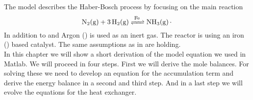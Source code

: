 \documentclass[paper=letter, fontsize=12pt]{article}
\newcommand\reaction[1]{\begin{equation}\ce{#1}\end{equation}}
\begin{document}
The model describes the Haber-Bosch process by focusing on the main reaction
\reaction{N2(g) + 3H2(g) <=>[Fe] NH3(g).} \label{f:reaction}
In addition to  and  Argon () is used as an inert gas. The reactor is using an iron () based catalyst. The same assumptions as in \cite{Jinasena2016} are holding.\\
In this chapter we will show a short derivation of the model equation we used in Matlab. We will proceed in four steps. First we will derive the mole balances. For solving these we need to develop an equation for the accumulation term and derive the energy balance in a second and third step. And in a last step we will evolve the equations for the heat exchanger.

\begin{figure}
\begin{centering}
\end{centering}
\end{figure}
\end{document}
